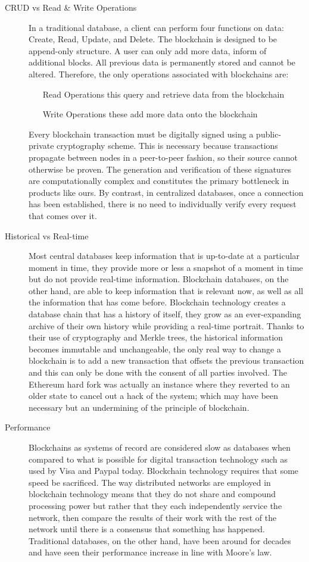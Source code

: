 \begin{description}
    \item[CRUD vs Read \& Write Operations] In a traditional database, a client can perform four functions on data: Create, Read, Update, and Delete. The blockchain is designed to be append-only structure. A user can only add more data, inform of additional blocks. All previous data is permanently stored and cannot be altered. Therefore, the only operations associated with blockchains are:
    \begin{itemize}
     \item [Read Operations] this query and retrieve data from the blockchain
     \item [Write Operations] these add more data onto the blockchain
    \end{itemize}
    Every blockchain transaction must be digitally signed using a public-private cryptography scheme. This is necessary because transactions propagate between nodes in a peer-to-peer fashion, so their source cannot otherwise be proven. The generation and verification of these signatures are computationally complex and constitutes the primary bottleneck in products like ours. By contrast, in centralized databases, once a connection has been established, there is no need to individually verify every request that comes over it.

    \item[Historical vs Real-time]
    Most central databases keep information that is up-to-date at a particular moment in time, they provide more or less a snapshot of a moment in time but do not provide real-time information. Blockchain databases, on the other hand, are able to keep information that is relevant now, as well as all the information that has come before. Blockchain technology creates a database chain that has a history of itself, they grow as an ever-expanding archive of their own history while providing a real-time portrait. Thanks to their use of cryptography and Merkle trees, the historical information becomes immutable and unchangeable, the only real way to change a blockchain is to add a new transaction that offsets the previous transaction and this can only be done with the consent of all parties involved. The Ethereum hard fork was actually an instance where they reverted to an older state to cancel out a hack of the system; which may have been necessary but an undermining of the principle of blockchain. \cite{steemit2}
    
    \item[Performance] Blockchains as systems of record are considered slow as databases when compared to what is possible for digital transaction technology such as used by Visa and Paypal today. Blockchain technology requires that some speed be sacrificed. The way distributed networks are employed in blockchain technology means that they do not share and compound processing power but rather that they each independently service the network, then compare the results of their work with the rest of the network until there is a consensus that something has happened. Traditional databases, on the other hand, have been around for decades and have seen their performance increase in line with Moore's law.\cite{steemit2}
    

\end{description}
